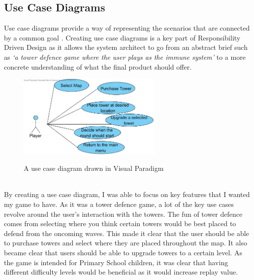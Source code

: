 \documentclass[a4paper,12pt]{article}
\begin{document}
\subsection*{Use Case Diagrams}
Use case diagrams provide a way of representing the scenarios that are connected by a common goal \cite{UML-Distilled}. Creating use case diagrams is a key part of Responsibility Driven Design as it allows the system architect to go from an abstract brief such as \textit{`a tower defence game where the user plays as the immune system'} to a more concrete understanding of what the final product should offer. 
\begin{figure}[h!]
	\begin{center}
		\includegraphics[width=7cm, origin=h]{images/Use-Case.jpg}
		\\
		\caption{A use case diagram drawn in Visual Paradigm}
	\end{center}
\end{figure}
\\
By creating a use case diagram, I was able to focus on key features that I wanted my game to have. As it was a tower defence game, a lot of the key use cases revolve around the user's interaction with the towers. The fun of tower defence comes from selecting where you think certain towers would be best placed to defend from the oncoming waves. This made it clear that the user should be able to purchase towers and select where they are placed throughout the map. It also became clear that users should be able to upgrade towers to a certain level. As the game is intended for Primary School children, it was clear that having different difficulty levels would be beneficial as it would increase replay value. 
\end{document}
